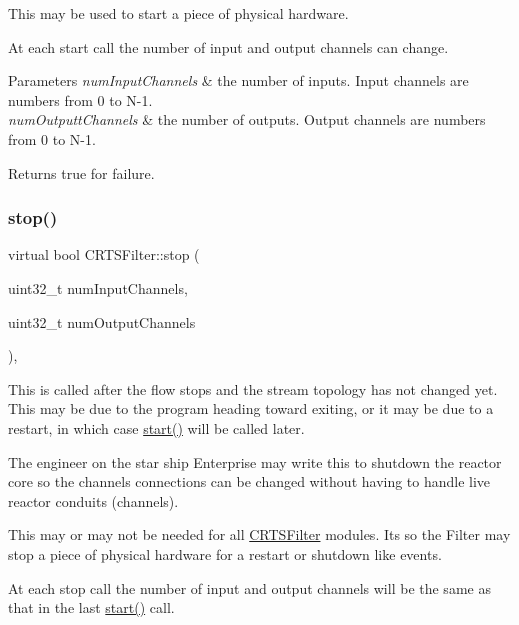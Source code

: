 This may be used to start a piece of physical hardware.

At each start call the number of input and output channels can change.


\begin{DoxyParams}{Parameters}
{\em num\+Input\+Channels} & the number of inputs. Input channels are numbers from 0 to N-\/1.\\
\hline
{\em num\+Outputt\+Channels} & the number of outputs. Output channels are numbers from 0 to N-\/1.\\
\hline
\end{DoxyParams}
\begin{DoxyReturn}{Returns}
true for failure. 
\end{DoxyReturn}
\mbox{\label{classCRTSFilter_a934e38c5cd6bd82b309166180f664f0c}} 
\subsubsection{\texorpdfstring{stop()}{stop()}}
{\footnotesize\ttfamily virtual bool C\+R\+T\+S\+Filter\+::stop (\begin{DoxyParamCaption}\item[{uint32\+\_\+t}]{num\+Input\+Channels,  }\item[{uint32\+\_\+t}]{num\+Output\+Channels }\end{DoxyParamCaption})\hspace{0.3cm}{\ttfamily [inline]}, {\ttfamily [virtual]}}

This is called after the flow stops and the stream topology has not changed yet. This may be due to the program heading toward exiting, or it may be due to a restart, in which case \hyperlink{classCRTSFilter_a15a3e99b38a67fd40559776d468b95fa}{start()} will be called later.

The engineer on the star ship Enterprise may write this to shutdown the reactor core so the channels connections can be changed without having to handle live reactor conduits (channels).

This may or may not be needed for all \hyperlink{classCRTSFilter}{C\+R\+T\+S\+Filter} modules. It\textquotesingle{}s so the Filter may stop a piece of physical hardware for a restart or shutdown like events.

At each stop call the number of input and output channels will be the same as that in the last \hyperlink{classCRTSFilter_a15a3e99b38a67fd40559776d468b95fa}{start()} call.


